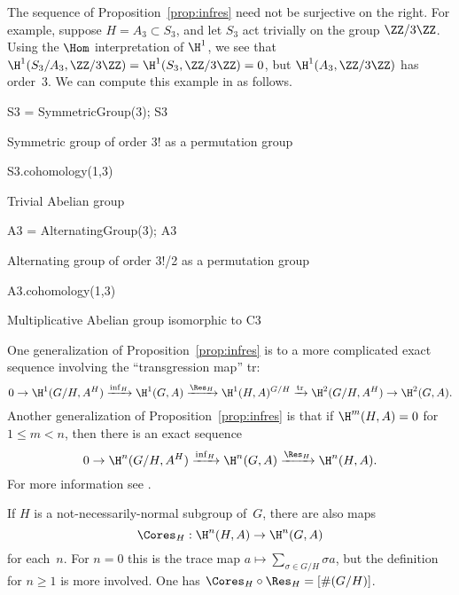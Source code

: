 \begin{example}
  The sequence of Proposition~\ref{prop:infres} need not be
  surjective on the right.  For example, suppose $H=A_3 \subset S_3$,
  and let $S_3$ act trivially on the group $\ZZ/3\ZZ$.
  Using the $\Hom$ interpretation of $\H^1$, we see
  that
  $\H^1(S_3/A_3, \ZZ/3\ZZ) = \H^1(S_3, \ZZ/3\ZZ) = 0$, but
  $\H^1(A_3, \ZZ/3\ZZ)$ has order~$3$.
  We can compute this example in {\Sage} as follows.
\begin{sagecode}
\begin{sagecell}
S3 = SymmetricGroup(3); S3
\end{sagecell}
\begin{sageout}
Symmetric group of order 3! as a permutation group
\end{sageout}
\begin{sagecell}
S3.cohomology(1,3)
\end{sagecell}
\begin{sageout}
Trivial Abelian group
\end{sageout}
\begin{sagecell}
A3 = AlternatingGroup(3); A3
\end{sagecell}
\begin{sageout}
Alternating group of order 3!/2 as a permutation group
\end{sageout}
\begin{sagecell}
A3.cohomology(1,3)
\end{sagecell}
\begin{sageout}
Multiplicative Abelian group isomorphic to C3
\end{sageout}
\end{sagecode}
\end{example}


\begin{remark}
  One generalization of Proposition~\ref{prop:infres} is to
  a more complicated exact sequence involving the ``transgression map''
  tr:
  \[
    0 \to \H^1(G/H, A^H) \xrightarrow{\inf_H} \H^1(G,A) \xrightarrow{\Res_H} \H^1(H,A)^{G/H}
    \xrightarrow{{\rm tr}} \H^2(G/H,A^H) \to \H^2(G,A).
  \]
  Another generalization of Proposition~\ref{prop:infres}
  is that if $\H^m(H,A) = 0$ for $1\leq m < n$, then
  there is an exact sequence
  \[
    0 \to \H^n(G/H, A^H) \xrightarrow{\inf_H} \H^n(G,A) \xrightarrow{\Res_H} \H^n(H,A).
  \]
  For more information see \cite[Ch.~VII.6]{serre:localfields}.
\end{remark}

\begin{remark}\label{rmk:cores}
  If $H$ is a not-necessarily-normal subgroup of~$G$, there are also
  maps
  \[
    \Cores_H: \H^n(H,A) \to \H^n(G,A)
  \]
  for each~$n$.  For $n=0$ this is the trace map
  $a\mapsto \sum_{\sigma \in G/H} \sigma a$, but the
  definition for $n\geq 1$ is more involved. One has
  $\Cores_H \circ \Res_H = [\#(G/H)]$.
\end{remark}

